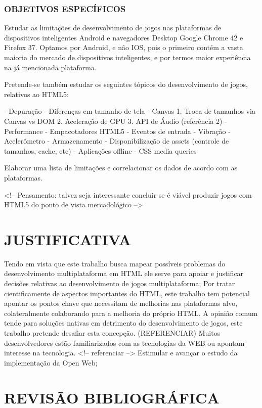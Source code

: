 \documentclass[11pt,a4paper]{article}
\begin{document}
\subsection{  OBJETIVOS ESPECÍFICOS}

Estudar as limitações de desenvolvimento de jogos nas plataformas de
dispositivos inteligentes Android e navegadores Desktop Google Chrome 42
e Firefox 37. Optamos por Android, e não IOS, pois o primeiro contém
a vasta maioria do mercado de dispositivos inteligentes, e por termos
maior experiência na já mencionada plataforma.

Pretende-se também estudar os seguintes tópicos do desenvolvimento de
jogos, relativos ao HTML5:

- Depuração
- Diferenças em tamanho de tela
- Canvas
1. Troca de tamanhos via Canvas vs DOM
2. Aceleração de GPU
3. API de Áudio (referência 2)
- Performance
- Empacotadores HTML5
- Eventos de entrada
- Vibração
- Acelerômetro
- Armazenamento
- Disponibilização de assets (controle de tamanhos, cache, etc)
- Aplicações offline
- CSS media queries

Elaborar uma lista de limitações e correlacionar os dados de acordo
com as plataformas.

<!-- Pensamento: talvez seja interessante concluir se é viável
produzir jogos com HTML5 do ponto de vista mercadológico --> %

\chapter{JUSTIFICATIVA}

Tendo em vista que este trabalho busca mapear possíveis problemas
do desenvolvimento multiplataforma em HTML ele serve para apoiar
e justificar decisões relativas ao desenvolvimento de jogos
multiplataforma; Por tratar cientificamente de aspectos importantes do
HTML, este trabalho tem potencial apontar os pontos chave que necessitam
de melhorias nas plataformas alvo, colateralmente colaborando para a
melhoria do próprio HTML.
A opinião comum tende para soluções nativas em detrimento do
desenvolvimento de jogos, este trabalho pretende desafiar esta
concepção. (REFERENCIAR) Muitos desenvolvedores estão familiarizados
com as tecnologias da WEB ou apontam interesse na tecnologia. <!--
referenciar -->
Estimular e avançar o estudo da implementação da Open Web;

\chapter{REVISÃO BIBLIOGRÁFICA}
\end{document}
